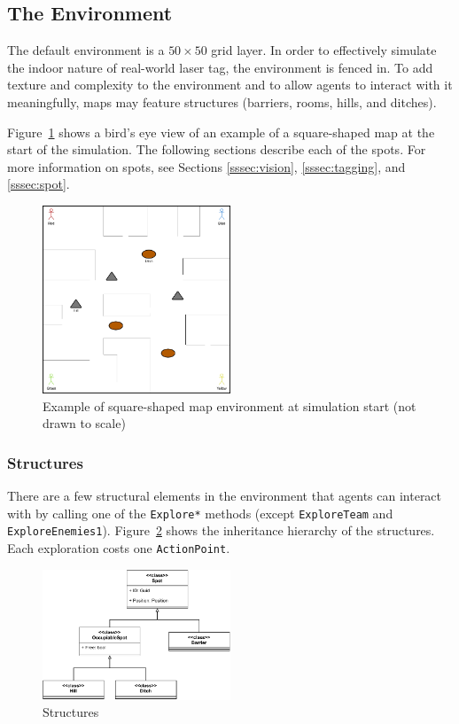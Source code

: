 \documentclass[a4paper,english,DIV=16,11pt,parskip=half,dvipsnames,listof=totoc,index=totoc,bibliography=totoc]{scrartcl}
\begin{document}
\subsection{The Environment} \label{ssec:env}
The default environment is a $50\times 50$ grid layer. In order to effectively simulate the indoor nature of real-world laser tag, the environment is fenced in. To add texture and complexity to the environment and to allow agents to interact with it meaningfully, maps may feature structures (barriers, rooms, hills, and ditches).

Figure~\ref{fig:envEx} shows a bird's eye view of an example of a square-shaped map at the start of the simulation. The following sections describe each of the spots. For more information on spots, see Sections \ref{sssec:vision}, \ref{sssec:tagging}, and \ref{sssec:spot}.
%
\begin{figure}[H]
  \centering
  \includegraphics[width=0.5\textwidth, height=0.5\textheight,keepaspectratio]{img/ExampleGameWorldAtSimStart.png}
  \caption{Example of square-shaped map environment at simulation start (not drawn to scale)}
  \label{fig:envEx}
\end{figure}
%
\subsubsection{Structures} \label{sssec:struc}
There are a few structural elements in the environment that agents can interact with by calling one of the \texttt{Explore*} methods (except \texttt{ExploreTeam} and \texttt{ExploreEnemies1}). Figure~\ref*{fig:structures} shows the inheritance hierarchy of the structures. Each exploration costs one \texttt{ActionPoint}.
%
\begin{figure}[H]
    \centering
    \includegraphics[width=0.5\textwidth, height=0.5\textheight,keepaspectratio]{img/lasertag-env-comps.pdf}
    \caption{Structures}
    \label{fig:structures}
\end{figure}
%
\end{document}
